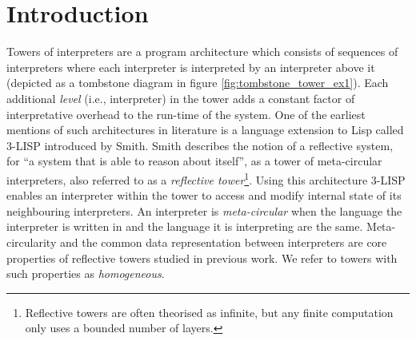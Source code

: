 \documentclass[sigplan,anonymous,review]{acmart}
\theoremstyle{definition}
\begin{document}



\maketitle

\section{Introduction}
Towers of interpreters are a program architecture which consists of sequences of interpreters where each interpreter is interpreted by an interpreter above it (depicted as a tombstone diagram in figure \ref{fig:tombstone_tower_ex1}). Each additional \textit{level} (i.e., interpreter) in the tower adds a constant factor of interpretative overhead to the run-time of the system. One of the earliest mentions of such architectures in literature is a language extension to Lisp called 3-LISP \cite{smith1984reflection} introduced by Smith. Smith describes the notion of a reflective system, for ``a system that is able to reason
about itself'', as a tower of meta-circular interpreters, also referred to as a \textit{reflective tower}\footnote{
Reflective towers are often theorised as infinite, but any finite
computation only uses a bounded number of layers.}.
Using this architecture 3-LISP enables an interpreter within the tower to access and modify internal state of its neighbouring interpreters. An interpreter is \textit{meta-circular} when the language the interpreter is written in and the language it is interpreting are the same. Meta-circularity and the common data representation between interpreters are core properties of reflective towers studied in previous work. We refer to towers with such properties as \textit{homogeneous}.
\end{document}
